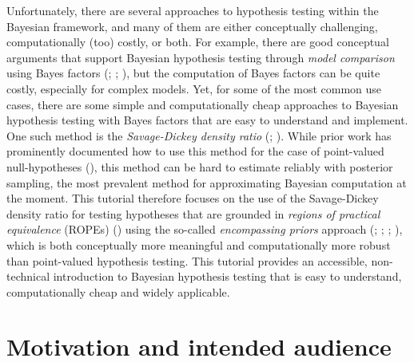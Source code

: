 \documentclass[
  doc,
  floatsintext,
  longtable,
  nolmodern,
  notxfonts,
  notimes,
  colorlinks=true,linkcolor=blue,citecolor=blue,urlcolor=blue]{apa7}
\begin{document}
Unfortunately, there are several approaches to hypothesis testing within
the Bayesian framework, and many of them are either conceptually
challenging, computationally (too) costly, or both. For example, there
are good conceptual arguments that support Bayesian hypothesis testing
through \emph{model comparison} using Bayes factors
(;
;
), but the computation of Bayes factors can be quite
costly, especially for complex models. Yet, for some of the most common
use cases, there are some simple and computationally cheap approaches to
Bayesian hypothesis testing with Bayes factors that are easy to
understand and implement. One such method is the \emph{Savage-Dickey
density ratio} (;
). While prior work has prominently documented how to use this
method for the case of point-valued null-hypotheses
(), this method can be hard to estimate reliably with posterior
sampling, the most prevalent method for approximating Bayesian
computation at the moment. This tutorial therefore focuses on the use of
the Savage-Dickey density ratio for testing hypotheses that are grounded
in \emph{regions of practical equivalence} (ROPEs)
()
using the so-called \emph{encompassing priors} approach
(;
; ;
), which is both conceptually more meaningful and computationally
more robust than point-valued hypothesis testing. This tutorial provides
an accessible, non-technical introduction to Bayesian hypothesis testing
that is easy to understand, computationally cheap and widely applicable.

\section{Motivation and intended
audience}\label{motivation-and-intended-audience}
\end{document}
